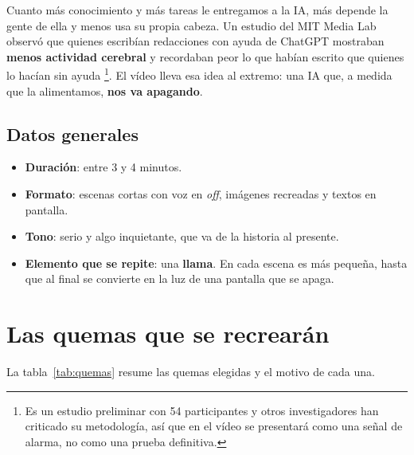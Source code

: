 \documentclass[11pt,a4paper,twoside,openright]{book}
\begin{document}
Cuanto más conocimiento y más tareas le entregamos a la IA, más depende la
gente de ella y menos usa su propia cabeza. Un estudio del MIT Media Lab
observó que quienes escribían redacciones con ayuda de ChatGPT mostraban
\textbf{menos actividad cerebral} y recordaban peor lo que habían escrito que
quienes lo hacían sin ayuda \cite{kosmyna2025}\footnote{Es un estudio preliminar
con 54 participantes y otros investigadores han criticado su metodología, así que
en el vídeo se presentará como una señal de alarma, no como una prueba
definitiva.}. El vídeo lleva esa idea al extremo: una IA que, a medida que la
alimentamos, \textbf{nos va apagando}.

\subsection{Datos generales}

\begin{itemize}
  \item \textbf{Duración}: entre 3 y 4 minutos.
  \item \textbf{Formato}: escenas cortas con voz en \textit{off}, imágenes
        recreadas y textos en pantalla.
  \item \textbf{Tono}: serio y algo inquietante, que va de la historia al
        presente.
  \item \textbf{Elemento que se repite}: una \textbf{llama}. En cada escena es
        más pequeña, hasta que al final se convierte en la luz de una pantalla
        que se apaga.
\end{itemize}

\section{Las quemas que se recrearán}

La tabla~\ref{tab:quemas} resume las quemas elegidas y el motivo de cada una.
\end{document}
